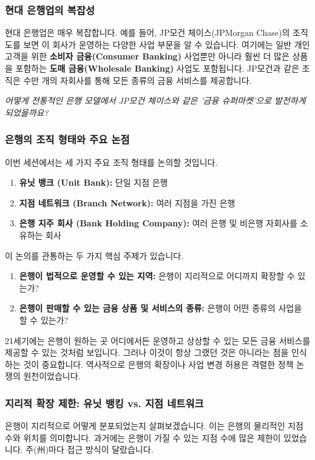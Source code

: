 \documentclass[11pt,a4paper]{article}
\begin{document}
\subsubsection*{현대 은행업의 복잡성}
현대 은행업은 매우 복잡합니다. 예를 들어, JP모건 체이스(JPMorgan Chase)의 조직도를 보면 이 회사가 운영하는 다양한 사업 부문을 알 수 있습니다. 여기에는 일반 개인 고객을 위한 \textbf{소비자 금융(Consumer Banking)} 사업뿐만 아니라 훨씬 더 많은 상품을 포함하는 \textbf{도매 금융(Wholesale Banking)} 사업도 포함됩니다. JP모건과 같은 조직은 수만 개의 자회사를 통해 모든 종류의 금융 서비스를 제공합니다.

\begin{center}
    \textit{어떻게 전통적인 은행 모델에서 JP모건 체이스와 같은 '금융 슈퍼마켓'으로 발전하게 되었을까요?}
\end{center}

\subsubsection*{은행의 조직 형태와 주요 논점}
이번 세션에서는 세 가지 주요 조직 형태를 논의할 것입니다.
\begin{enumerate}
    \item \textbf{유닛 뱅크 (Unit Bank):} 단일 지점 은행
    \item \textbf{지점 네트워크 (Branch Network):} 여러 지점을 가진 은행
    \item \textbf{은행 지주 회사 (Bank Holding Company):} 여러 은행 및 비은행 자회사를 소유하는 회사
\end{enumerate}
이 논의를 관통하는 두 가지 핵심 주제가 있습니다.
\begin{enumerate}
    \item \textbf{은행이 법적으로 운영할 수 있는 지역:} 은행이 지리적으로 어디까지 확장할 수 있는가?
    \item \textbf{은행이 판매할 수 있는 금융 상품 및 서비스의 종류:} 은행이 어떤 종류의 사업을 할 수 있는가?
\end{enumerate}
21세기에는 은행이 원하는 곳 어디에서든 운영하고 상상할 수 있는 모든 금융 서비스를 제공할 수 있는 것처럼 보입니다. 그러나 이것이 항상 그랬던 것은 아니라는 점을 인식하는 것이 중요합니다. 역사적으로 은행의 확장이나 사업 변경 허용은 격렬한 정책 논쟁의 원천이었습니다.

\subsubsection*{지리적 확장 제한: 유닛 뱅킹 vs. 지점 네트워크}
은행이 지리적으로 어떻게 분포되었는지 살펴보겠습니다. 이는 은행의 물리적인 지점 수와 위치를 의미합니다. 과거에는 은행이 가질 수 있는 지점 수에 많은 제한이 있었습니다. 주(州)마다 접근 방식이 달랐습니다.
\end{document}
